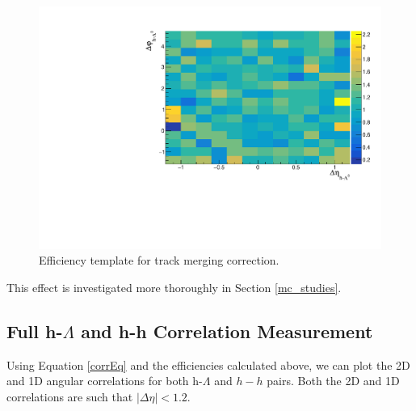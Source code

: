 \documentclass[ALICE,manyauthors]{ALICE_analysis_notes}
\begin{document}
\begin{figure}[ht]
\centering
\includegraphics[width=5in]{figures/trackmerge_efficiency_PLACEHOLDER.pdf}
\caption{Efficiency template for track merging correction.}
\label{trackmerge_efficiency_plot}
\end{figure}

This effect is investigated more thoroughly in Section \ref{mc_studies}.

\subsection{Full h-$\Lambda$ and h-h Correlation Measurement}

Using Equation \ref{corrEq} and the efficiencies calculated above, we can plot the 2D and 1D angular correlations for both h-$\Lambda$ and $h-h$ pairs. Both the 2D and 1D correlations are such that $|\Delta\eta| < 1.2$.
\end{document}
